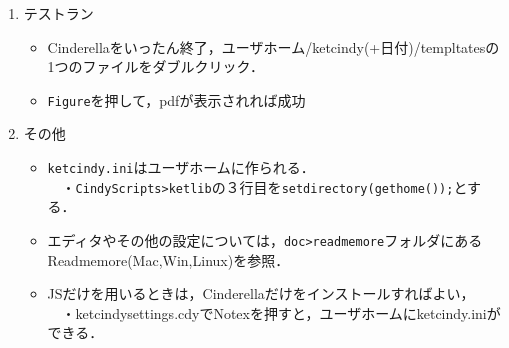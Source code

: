 \documentclass{ujarticle}
\begin{document}
\begin{enumerate}[\bf\large 1.]
\item テストラン\vspace{-2mm}

\begin{itemize}
 \item Cinderellaをいったん終了，ユーザホーム/ketcindy(+日付)/templtatesの1つのファイルをダブルクリック．\vspace{-1mm}
\item\verb|Figure|を押して，pdfが表示されれば成功
\end{itemize}

\item  その他\vspace{-2mm}
\begin{itemize}
\item \verb|ketcindy.ini|はユーザホームに作られる．\\
　・\verb|CindyScripts>ketlib|の３行目を\verb|setdirectory(gethome());|とする．

\item エディタやその他の設定については，\verb|doc>readmemore|フォルダにあるReadmemore(Mac,Win,Linux)を参照．
\item \ketcindy JSだけを用いるときは，Cinderellaだけをインストールすればよい，\\
　・ketcindysettings.cdyでNotexを押すと，ユーザホームにketcindy.iniができる．
\end{itemize}

\end{enumerate}
\end{document}

